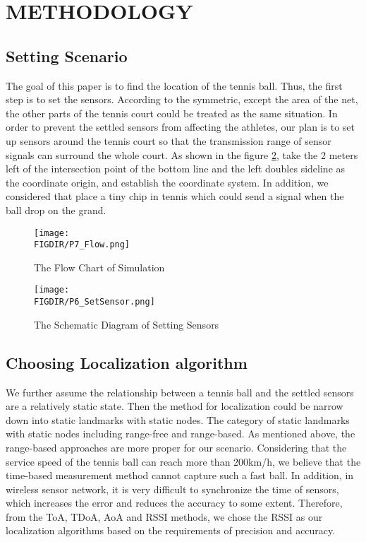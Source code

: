 

\section{METHODOLOGY}
\subsection{Setting Scenario}
The goal of this paper is to find the location of the tennis ball. 
Thus, the first step is to set the sensors. According to the symmetric, except the area of the net, the other parts of the tennis court could be treated as the same situation. In order to prevent the settled sensors from affecting the athletes, our plan is to set up sensors around the tennis court so that the transmission range of sensor signals can surround the whole court. As shown in the figure \ref{sensors}, take the 2 meters left of the intersection point of the bottom line and the left doubles sideline as the coordinate origin, and establish the coordinate system. In addition, we considered that place a tiny chip in tennis which could send a signal when the ball drop on the grand.\\
\begin{figure}[ht]
\centering
\texttt{[image: \\FIGDIR/P7\_Flow.png]}
\caption{The Flow Chart of Simulation}
\label{flow chart}
\end{figure}

\begin{figure}[ht]
\centering
\texttt{[image: \\FIGDIR/P6\_SetSensor.png]}
\caption{The Schematic Diagram of Setting Sensors}
\label{sensors}
\end{figure}
\subsection{Choosing Localization algorithm}
We further assume the relationship between a tennis ball and the settled sensors are a relatively static state. Then the method for localization could be narrow down into static landmarks with static nodes. The category of static landmarks with static nodes including range-free and range-based. As mentioned above, the range-based approaches are more proper for our scenario. Considering that the service speed of the tennis ball can reach more than 200km/h, we believe that the time-based measurement method cannot capture such a fast ball. In addition, in wireless sensor network, it is very difficult to synchronize the time of sensors, which increases the error and reduces the accuracy to some extent. Therefore, from the ToA, TDoA, AoA and RSSI methods, we chose the RSSI as our localization algorithms based on the requirements of precision and accuracy.\\

